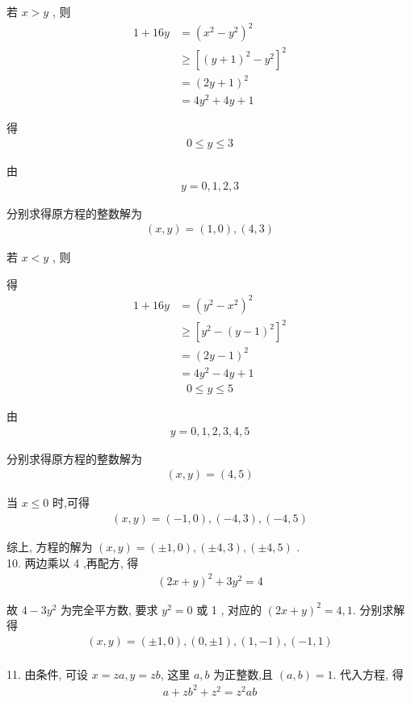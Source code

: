 若 $x>y$ , 则\begin{align}
	1+16 y & =\left(x^{2}-y^{2}\right)^{2}             \\
	       & \geqslant\left[(y+1)^{2}-y^{2}\right]^{2} \\
	       & =(2 y+1)^{2}                              \\
	       & =4 y^{2}+4 y+1
\end{align}

得
\begin{align*}
	0 \leqslant y \leqslant 3
\end{align*}

由
\begin{align*}
	y=0,1,2,3
\end{align*}

分别求得原方程的整数解为
\begin{align*}
	(x, y)=(1,0),(4,3)
\end{align*}

若 $x<y$ , 则

得\begin{align}
	1+16 y & =\left(y^{2}-x^{2}\right)^{2}             \\
	       & \geqslant\left[y^{2}-(y-1)^{2}\right]^{2} \\
	       & =(2 y-1)^{2}                              \\
	       & =4 y^{2}-4 y+1
\end{align}
\begin{align*}
	0 \leqslant y \leqslant 5
\end{align*}

由
\begin{align*}
	y=0,1,2,3,4,5
\end{align*}

分别求得原方程的整数解为
\begin{align*}
	(x, y)=(4,5)
\end{align*}

当 $x \leqslant 0$ 时,可得
\begin{align*}
	(x, y)=(-1,0),(-4,3),(-4,5)
\end{align*}

综上, 方程的解为 $(x, y)=( \pm 1,0),( \pm 4,3),( \pm 4,5)$ . \\
10. 两边乘以 4 ,再配方, 得
\begin{align*}
	(2 x+y)^{2}+3 y^{2}=4
\end{align*}

故 $4-3 y^{2}$ 为完全平方数, 要求 $y^{2}=0$ 或 1 , 对应的 $(2 x+y)^{2}=4,1$. 分别求解得
\begin{align*}
	(x, y)=( \pm 1,0),(0, \pm 1),(1,-1),(-1,1)
\end{align*}\\
11. 由条件, 可设 $x=z a, y=z b$, 这里 $a ,  b$ 为正整数,且 $(a, b)=1$. 代入方程, 得
\begin{align*}
	a+z b^{2}+z^{2}=z^{2} a b
\end{align*}

